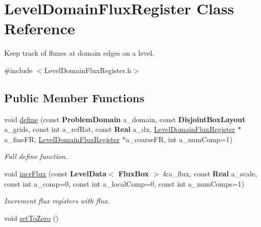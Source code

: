 \hypertarget{class_level_domain_flux_register}{}\section{Level\+Domain\+Flux\+Register Class Reference}
\label{class_level_domain_flux_register}


Keep track of fluxes at domain edges on a level.  




{\ttfamily \#include $<$Level\+Domain\+Flux\+Register.\+h$>$}

\subsection*{Public Member Functions}
\begin{DoxyCompactItemize}
\item 
\mbox{\label{class_level_domain_flux_register_a90e360a497f1e07f22c929418d826189}} 
void \hyperlink{class_level_domain_flux_register_a90e360a497f1e07f22c929418d826189}{define} (const \textbf{ Problem\+Domain} a\+\_\+domain, const \textbf{ Disjoint\+Box\+Layout} a\+\_\+grids, const int a\+\_\+ref\+Rat, const \textbf{ Real} a\+\_\+dx, \hyperlink{class_level_domain_flux_register}{Level\+Domain\+Flux\+Register} $\ast$a\+\_\+fine\+FR, \hyperlink{class_level_domain_flux_register}{Level\+Domain\+Flux\+Register} $\ast$a\+\_\+coarse\+FR, int a\+\_\+num\+Comp=1)
\begin{DoxyCompactList}\small\item\em Full define function. \end{DoxyCompactList}\item 
\mbox{\label{class_level_domain_flux_register_a5aef8a373b5ce33cabca8d1d5af6a0a3}} 
void \hyperlink{class_level_domain_flux_register_a5aef8a373b5ce33cabca8d1d5af6a0a3}{incr\+Flux} (const \textbf{ Level\+Data}$<$ \textbf{ Flux\+Box} $>$ \&a\+\_\+flux, const \textbf{ Real} a\+\_\+scale, const int a\+\_\+comp=0, const int a\+\_\+local\+Comp=0, const int a\+\_\+num\+Comps=1)
\begin{DoxyCompactList}\small\item\em Increment flux registers with flux. \end{DoxyCompactList}\item 
void \hyperlink{class_level_domain_flux_register_a973e5a08f8e4df24cbdf4664e8b17b70}{set\+To\+Zero} ()

\end{DoxyCompactItemize}
